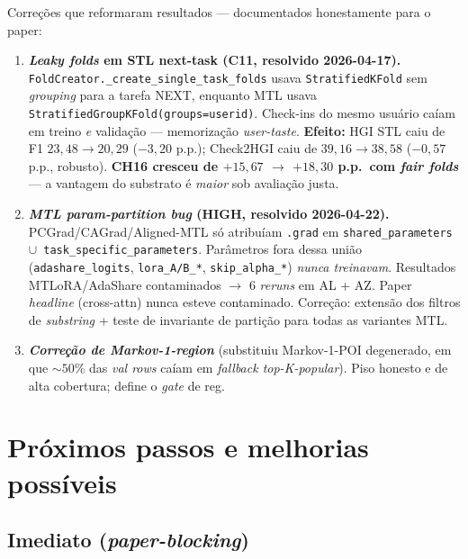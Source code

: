\documentclass[11pt,a4paper]{article}
\begin{document}
Correções que reformaram resultados --- documentados honestamente para o paper:

\begin{enumerate}[leftmargin=*]

\item \textbf{\textit{Leaky folds} em STL next-task (C11, resolvido 2026-04-17).} \texttt{FoldCreator.\_create\_single\_task\_folds} usava \texttt{StratifiedKFold} sem \textit{grouping} para a tarefa NEXT, enquanto MTL usava \texttt{StratifiedGroupKFold(groups=userid)}. Check-ins do mesmo usuário caíam em treino \emph{e} validação --- memorização \textit{user-taste}. \textbf{Efeito:} HGI STL caiu de F1 $23{,}48 \to 20{,}29$ ($-3{,}20$ p.p.); Check2HGI caiu de $39{,}16 \to 38{,}58$ ($-0{,}57$ p.p., robusto). \textbf{CH16 cresceu de $+15{,}67$ $\to$ $+18{,}30$ p.p.\ com \textit{fair folds}} --- a vantagem do substrato é \emph{maior} sob avaliação justa.

\item \textbf{\textit{MTL param-partition bug} (HIGH, resolvido 2026-04-22).} PCGrad/CAGrad/Aligned-MTL só atribuíam \texttt{.grad} em \texttt{shared\_parameters $\cup$ task\_specific\_parameters}. Parâmetros fora dessa união (\texttt{adashare\_logits}, \texttt{lora\_A/B\_*}, \texttt{skip\_alpha\_*}) \emph{nunca treinavam}. Resultados MTLoRA/AdaShare contaminados $\to$ 6 \textit{reruns} em AL + AZ. Paper \textit{headline} (cross-attn) nunca esteve contaminado. Correção: extensão dos filtros de \textit{substring} + teste de invariante de partição para todas as variantes MTL.

\item \textbf{\textit{Correção de Markov-1-region}} (substituiu Markov-1-POI degenerado, em que $\sim 50$\% das \textit{val rows} caíam em \textit{fallback top-K-popular}). Piso honesto e de alta cobertura; define o \textit{gate} de reg.

\end{enumerate}

\section{Próximos passos e melhorias possíveis}

\subsection*{Imediato (\textit{paper-blocking})}
\end{document}
